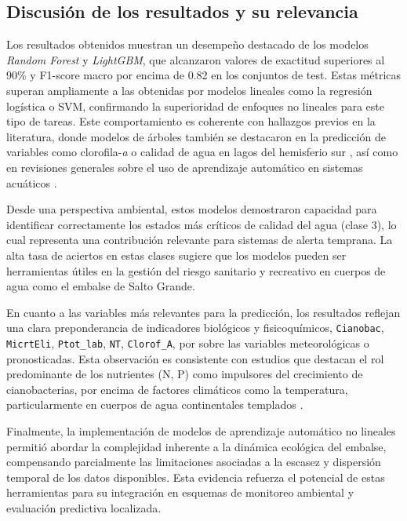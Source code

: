 \documentclass[11pt]{report}
\begin{document}
\subsection{Discusión de los resultados y su relevancia}

Los resultados obtenidos muestran un desempeño destacado de los modelos \textit{Random Forest} y \textit{LightGBM}, que alcanzaron valores de exactitud superiores al 90\% y F1-score macro por encima de 0.82 en los conjuntos de test. Estas métricas superan ampliamente a las obtenidas por modelos lineales como la regresión logística o SVM, confirmando la superioridad de enfoques no lineales para este tipo de tareas. Este comportamiento es coherente con hallazgos previos en la literatura, donde modelos de árboles también se destacaron en la predicción de variables como clorofila-\emph{a} o calidad de agua en lagos del hemisferio sur \citep{RodriguezLopez2023}, así como en revisiones generales sobre el uso de aprendizaje automático en sistemas acuáticos \citep{Schaeffer2024}.

Desde una perspectiva ambiental, estos modelos demostraron capacidad para identificar correctamente los estados más críticos de calidad del agua (clase 3), lo cual representa una contribución relevante para sistemas de alerta temprana. La alta tasa de aciertos en estas clases sugiere que los modelos pueden ser herramientas útiles en la gestión del riesgo sanitario y recreativo en cuerpos de agua como el embalse de Salto Grande.

En cuanto a las variables más relevantes para la predicción, los resultados reflejan una clara preponderancia de indicadores biológicos y fisicoquímicos, \texttt{Cianobac}, \texttt{MicrtEli}, \texttt{Ptot\_lab}, \texttt{NT}, \texttt{Clorof\_A}, por sobre las variables meteorológicas o pronosticadas. Esta observación es consistente con estudios que destacan el rol predominante de los nutrientes (N, P) como impulsores del crecimiento de cianobacterias, por encima de factores climáticos como la temperatura, particularmente en cuerpos de agua continentales templados \citep{Rigosi2014}.

Finalmente, la implementación de modelos de aprendizaje automático no lineales permitió abordar la complejidad inherente a la dinámica ecológica del embalse, compensando parcialmente las limitaciones asociadas a la escasez y dispersión temporal de los datos disponibles. Esta evidencia refuerza el potencial de estas herramientas para su integración en esquemas de monitoreo ambiental y evaluación predictiva localizada.
\end{document}
